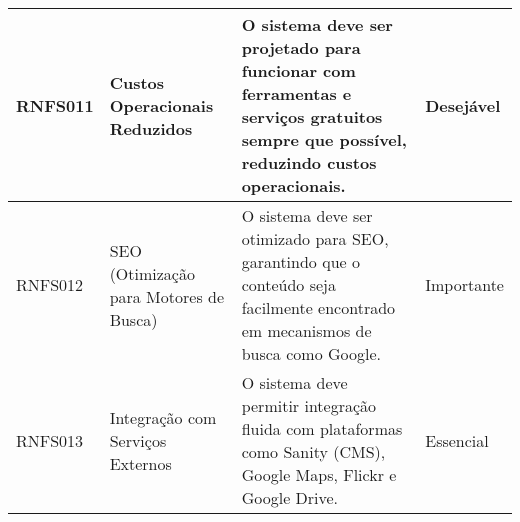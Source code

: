 {\begin{longtable}{|>{\raggedright}p{2.5cm}|>{\raggedright}p{4cm}|p{6cm}|>{\raggedright}p{2cm}|}
\hline
RNFS011 & Custos Operacionais Reduzidos & O sistema deve ser projetado para funcionar com ferramentas e serviços gratuitos sempre que possível, reduzindo custos operacionais. & Desejável \\
\hline
RNFS012 & SEO (Otimização para Motores de Busca) & O sistema deve ser otimizado para SEO, garantindo que o conteúdo seja facilmente encontrado em mecanismos de busca como Google. & Importante \\
\hline
RNFS013 & Integração com Serviços Externos & O sistema deve permitir integração fluida com plataformas como Sanity (CMS), Google Maps, Flickr e Google Drive. & Essencial \\
\hline
\end{longtable}
} %